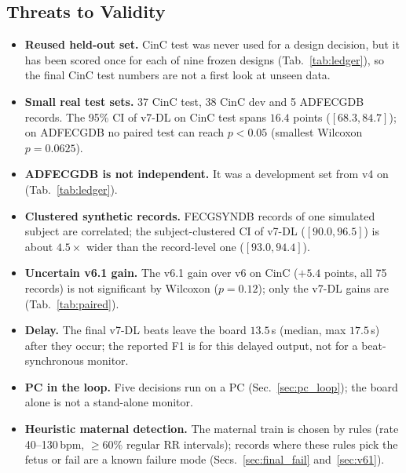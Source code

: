 
\begin{finalpart}
\subsection{Threats to Validity}
\label{sec:threats}
\begin{itemize}
    \item \textbf{Reused held-out set.} CinC test was never used for a design decision, but it has been scored once for each of nine frozen designs (Tab.~\ref{tab:ledger}), so the final CinC test numbers are not a first look at unseen data. %
    \item \textbf{Small real test sets.} 37 CinC test, 38 CinC dev and 5 ADFECGDB records. The 95\% CI of v7-DL on CinC test spans $16.4$ points ($[68.3, 84.7]$); on ADFECGDB no paired test can reach $p < 0.05$ (smallest Wilcoxon $p = 0.0625$). %
    \item \textbf{ADFECGDB is not independent.} It was a development set from v4 on (Tab.~\ref{tab:ledger}).
    \item \textbf{Clustered synthetic records.} FECGSYNDB records of one simulated subject are correlated; the subject-clustered CI of v7-DL ($[90.0, 96.5]$) is about $4.5\times$ wider than the record-level one ($[93.0, 94.4]$). %
    \item \textbf{Uncertain v6.1 gain.} The v6.1 gain over v6 on CinC ($+5.4$ points, all 75 records) is not significant by Wilcoxon ($p = 0.12$); only the v7-DL gains are (Tab.~\ref{tab:paired}). %
    \item \textbf{Delay.} The final v7-DL beats leave the board $13.5\,$s (median, max $17.5\,$s) after they occur; the reported F1 is for this delayed output, not for a beat-synchronous monitor.
    \item \textbf{PC in the loop.} Five decisions run on a PC (Sec.~\ref{sec:pc_loop}); the board alone is not a stand-alone monitor.
    \item \textbf{Heuristic maternal detection.} The maternal train is chosen by rules (rate 40--130\,bpm, $\ge 60\%$ regular RR intervals); records where these rules pick the fetus or fail are a known failure mode (Secs.~\ref{sec:final_fail} and~\ref{sec:v61}).

\end{itemize}
\end{finalpart}
